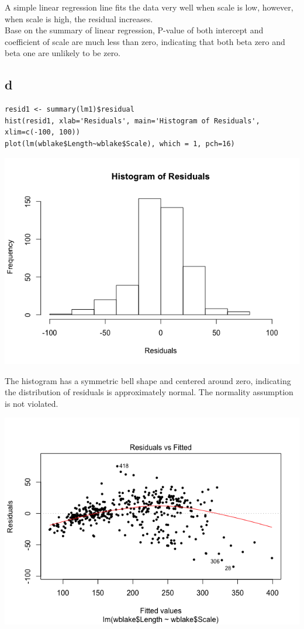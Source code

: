 \documentclass[11pt,letterpaper]{article}
\begin{document}
\noindent A simple linear regression line fits the data very well when scale is low, however, when scale is high, the residual increases. \\

\noindent Base on the summary of linear regression, P-value of both intercept and coefficient of scale are much less than zero, indicating that both beta zero and beta one are unlikely to be zero. 


\subsection*{d}
\begin{verbatim}
resid1 <- summary(lm1)$residual
hist(resid1, xlab='Residuals', main='Histogram of Residuals', xlim=c(-100, 100))
plot(lm(wblake$Length~wblake$Scale), which = 1, pch=16)
\end{verbatim}

\includegraphics[scale=0.6]{1-d-1.png}

\noindent The histogram has a symmetric bell shape and centered around zero, indicating the distribution of residuals is approximately normal. The normality assumption is not violated. 

\includegraphics[scale=0.6]{1-d-2.png}
\end{document}
